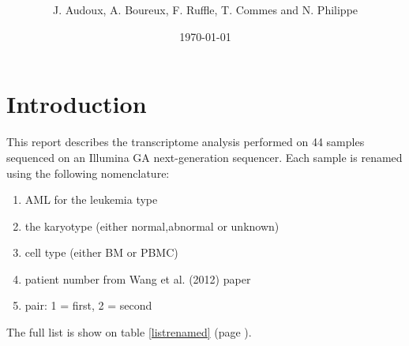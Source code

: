 \documentclass[a4paper]{article}\usepackage[]{graphicx}\usepackage[]{color}
\title{\textsc{}}
\author{J. Audoux, A. Boureux, F. Ruffle, T. Commes and N. Philippe}
\date{\today}
\newcommand{\GA}{an Illumina GA\xspace}
\newcommand{\nbsamples}{44\xspace}
\begin{document}
\maketitle
\tableofcontents
\newpage






\section{Introduction}

This report describes the transcriptome analysis performed on
\nbsamples samples sequenced on \GA next-generation sequencer. Each
sample is renamed using the following nomenclature:
\begin{enumerate}
\item AML for the leukemia type
\item the karyotype (either normal,abnormal or unknown)
\item cell type (either BM or PBMC)
\item patient number from Wang et al. (2012) paper
\item pair: 1 = first, 2 = second
\end{enumerate}

The full list is show on table \ref{listrenamed} (page \pageref{listrenamed}).
\end{document}
